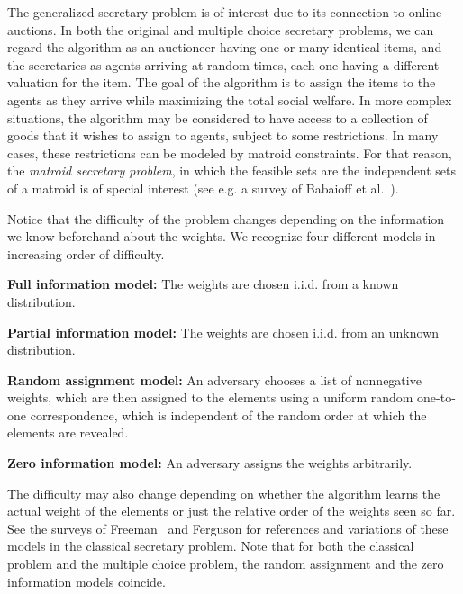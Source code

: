 \documentclass[letterpaper,11pt]{article}
\theoremstyle{definition}
\theoremstyle{remark}
\begin{document}
The generalized secretary problem is of interest due to its connection to online auctions. In both the original and multiple choice secretary problems, we can regard the algorithm as an auctioneer having one or many identical items, and the secretaries as agents arriving at random times, each one having a different valuation for the item. The goal of the algorithm is to assign the items to the agents as they arrive while maximizing the total social welfare. In more complex situations, the algorithm may be considered to have access to a collection of goods that it wishes to assign to agents, subject to some restrictions. In many cases, these restrictions can be modeled by matroid constraints. For that reason, the \emph{matroid secretary problem}, in which the feasible sets are the independent sets of a matroid is of special interest (see e.g. a survey of Babaioff et al.~\cite{babaioff_online_2008}).



Notice that the difficulty of the problem changes depending on the information we know beforehand about the weights. We recognize four different models in increasing order of difficulty. \begin{compactitem}
  \item \textbf{Full information model:} The weights are chosen i.i.d. from a known distribution.
  \item \textbf{Partial information model:} The weights are chosen i.i.d. from an unknown distribution.
  \item \textbf{Random assignment model:} An adversary chooses a list of nonnegative weights, which are then assigned to the elements using a uniform random one-to-one correspondence, which is independent of the random order at which the elements are revealed.
  \item \textbf{Zero information model:} An adversary assigns the weights arbitrarily.
\end{compactitem}

The difficulty may also change depending on whether the algorithm learns the actual weight of the elements or just the relative order of the weights seen so far. See the surveys of Freeman~\cite{freeman1983secretary} and Ferguson \cite{ferguson_who_1989} for references and variations of these models in the classical secretary problem. Note that for both the classical problem and the multiple choice problem, the random assignment and the zero information models coincide.
\end{document}
